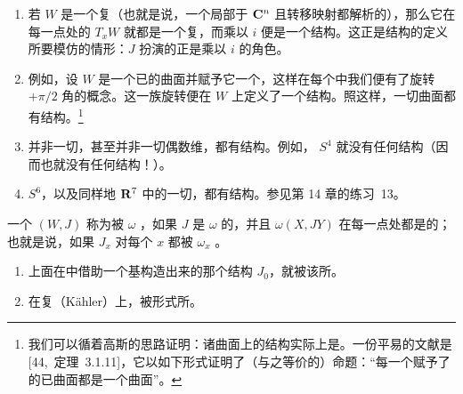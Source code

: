 \begin{example}\label{thm:examples-almost-complex-structures}
\begin{enumerate}[label=(\arabic*)]
\item 若 $W$ 是一个复\trManifold（也就是说，一个局部\trDiffeomorphic{}于 $\mathbf{C}^n$ 且转移映射都解析的\trManifold），那么它在每一点处的\trTangentSpace{} $T_xW$ 就都是一个复\trVectorSpace，而乘以 $i$ 便是一个\trAlmostComplex{}结构。这正是\trAlmostComplex{}结构的定义所要模仿的情形：$J$ 扮演的正是乘以 $i$ 的角色。
\item 例如，设 $W$ 是一个已\trOrientation{}的曲面并赋予它一个\trRiemann\trMetric，这样在每个\trTangentPlane{}中我们便有了旋转 $+\pi/2$ 角的概念。这一族旋转便在 $W$ 上定义了一个\trAlmostComplex{}结构。照这样，一切\trOrientable{}曲面都有\trAlmostComplex{}结构。\footnote{我们可以循着高斯的思路证明：诸曲面上的\trAlmostComplex{}结构实际上是\trComplexStructure。一份平易的文献是 [44,~定理~3.1.11]，它以如下形式证明了（与之等价的）命题：“每一个赋予了\trRiemann\trMetric{}的已\trOrientation{}曲面都是一个\trRiemann{}曲面”。}
\item 并非一切\trManifold，甚至并非一切偶数维\trManifold，都有\trAlmostComplex{}结构。例如，\trSphere{} $S^4$ 就没有任何\trAlmostComplex{}结构（因而也就没有任何\trSymplectic{}结构！）。
\item \trSphere{} $S^6$，以及同样地 $\mathbf{R}^7$ 中的一切\trOrientable{}\trHypersurface，都有\trAlmostComplex{}结构。参见第 14 章的练习~13。
\end{enumerate}
\end{example}

一个\trAlmostComplex{}\trManifold{} $(W,J)$ 称为被\trSymplecticForm{} $\omega$ \emph{\trCalibrated}，如果 $J$ 是 $\omega$ 的\trIsometry，并且\trSymmetricBilinearForm{} $\omega(X,JY)$ 在每一点处都是\trPositiveDefinite{}的；也就是说，如果 $J_x$ 对每个 $x$ 都被 $\omega_x$ \trCalibrated。
\begin{enumerate}[label=(\arabic*)]
\item 上面在\trSymplectic{}\trVectorSpace{}中借助一个\trSymplectic{}基构造出来的那个\trAlmostComplex{}结构 $J_0$，就被该\trSymplecticForm{}所\trCalibrated。
\item 在复\textbf{\trKaehler}（Kähler）\trManifold{}上，\trComplexStructure{}被\trKaehler{}形式所\trCalibrated。
\end{enumerate}

